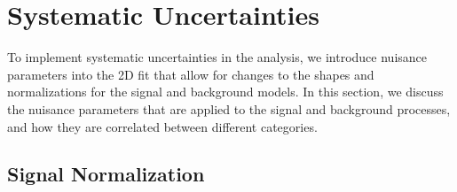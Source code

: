 
\section{Systematic Uncertainties}
\label{sec:uncert}

To implement systematic uncertainties in the analysis, we introduce nuisance parameters into the 2D fit that allow for changes to the shapes and normalizations for the signal and background models.
In this section, we discuss the nuisance parameters that are applied to the signal and background processes, and how they are correlated between different categories.

\subsection{Signal Normalization}

